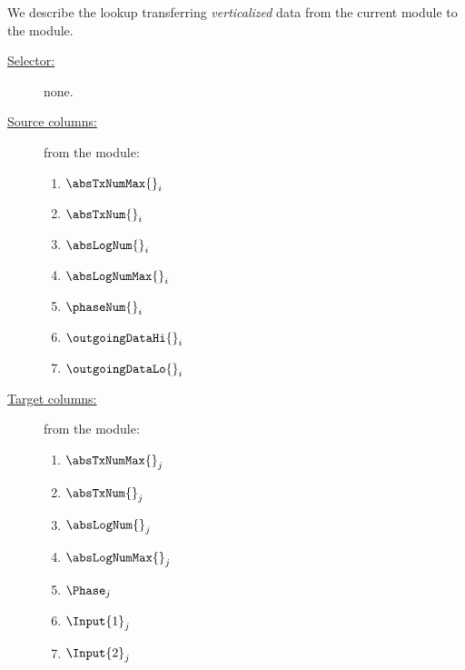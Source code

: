 We describe the lookup transferring \emph{verticalized} data from the current module to the \rlpTxnRcptMod{} module.
\begin{description}
	\item[\underline{Selector:}] none.
	\item[\underline{Source columns:}] from the \logInfoMod{} module:
	\begin{enumerate}
			\item $\absTxNumMax{}_{i}$
			\item $\absTxNum{}_{i}$
			\item $\absLogNum{}_{i}$
			\item $\absLogNumMax{}_{i}$
			\item $\phaseNum{}_{i}$
			\item $\outgoingDataHi{}_{i}$
			\item $\outgoingDataLo{}_{i}$
	\end{enumerate}
\item[\underline{Target columns:}] from the \rlpTxnRcptMod{} module: 
	\begin{enumerate}
			\item $\absTxNumMax{}_{j}$
			\item $\absTxNum{}_{j}$
			\item $\absLogNum{}_{j}$
			\item $\absLogNumMax{}_{j}$		
			\item $\Phase_{j}$
			\item $\Input{1}_{j}$
			\item $\Input{2}_{j}$
	\end{enumerate} 
\end{description}

